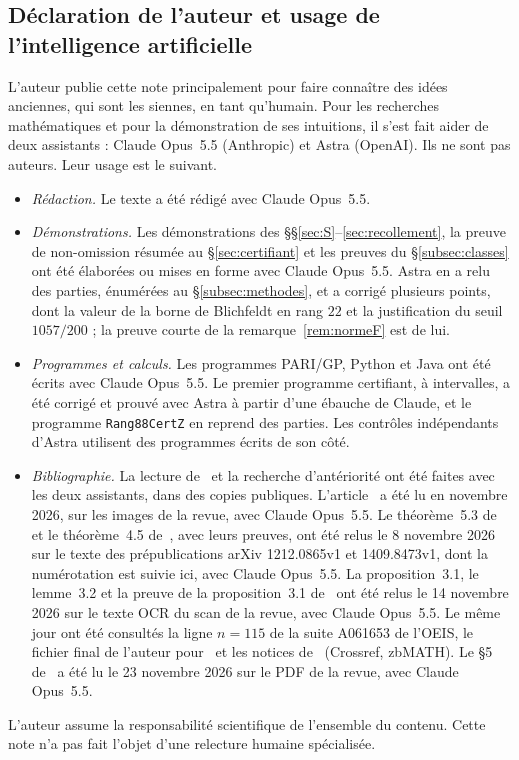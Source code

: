 \documentclass[11pt,a4paper]{amsart}
\theoremstyle{plain}
\theoremstyle{definition}
\numberwithin{equation}{section}
\begin{document}
\subsection*{Déclaration de l'auteur et usage de l'intelligence artificielle}
L'auteur publie cette note principalement pour faire connaître des idées anciennes, qui sont les siennes, en tant qu'humain. Pour les recherches mathématiques et pour la démonstration de ses intuitions, il s'est fait aider de deux assistants : Claude Opus~5.5 (Anthropic) et Astra (OpenAI). Ils ne sont pas auteurs. Leur usage est le suivant.
\begin{itemize}
\item \emph{Rédaction.} Le texte a été rédigé avec Claude Opus~5.5.
\item \emph{Démonstrations.} Les démonstrations des \S\S\ref{sec:S}--\ref{sec:recollement}, la preuve de non-omission résumée au \S\ref{sec:certifiant} et les preuves du \S\ref{subsec:classes} ont été élaborées ou mises en forme avec Claude Opus~5.5. Astra en a relu des parties, énumérées au \S\ref{subsec:methodes}, et a corrigé plusieurs points, dont la valeur de la borne de Blichfeldt en rang $22$ et la justification du seuil $1057/200$ ; la preuve courte de la remarque~\ref{rem:normeF} est de lui.
\item \emph{Programmes et calculs.} Les programmes PARI/GP, Python et Java ont été écrits avec Claude Opus~5.5. Le premier programme certifiant, à intervalles, a été corrigé et prouvé avec Astra à partir d'une ébauche de Claude, et le programme \texttt{Rang88CertZ} en reprend des parties. Les contrôles indépendants d'Astra utilisent des programmes écrits de son côté.
\item \emph{Bibliographie.} La lecture de~\cite{Sak26} et la recherche d'antériorité ont été faites avec les deux assistants, dans des copies publiques. L'article~\cite{Que81} a été lu en novembre 2026, sur les images de la revue, avec Claude Opus~5.5. Le théorème~5.3 de~\cite{Neb13} et le théorème~4.5 de~\cite{Neb16}, avec leurs preuves, ont été relus le 8 novembre 2026 sur le texte des prépublications arXiv 1212.0865v1 et 1409.8473v1, dont la numérotation est suivie ici, avec Claude Opus~5.5. La proposition~3.1, le lemme~3.2 et la preuve de la proposition~3.1 de~\cite{Bay84} ont été relus le 14 novembre 2026 sur le texte OCR du scan de la revue, avec Claude Opus~5.5. Le même jour ont été consultés la ligne $n=115$ de la suite A061653 de l'OEIS, le fichier final de l'auteur pour~\cite{Neb13} et les notices de~\cite{Que92} (Crossref, zbMATH). Le \S5 de~\cite{BFS05} a été lu le 23 novembre 2026 sur le PDF de la revue, avec Claude Opus~5.5.
\end{itemize}
L'auteur assume la responsabilité scientifique de l'ensemble du contenu. Cette note n'a pas fait l'objet d'une relecture humaine spécialisée.
\end{document}
